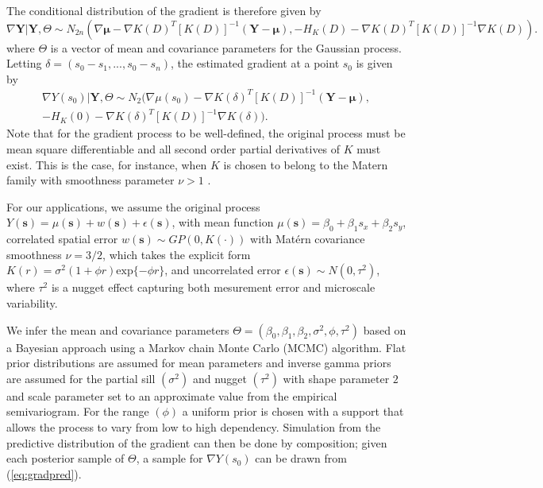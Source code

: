 \documentclass[12pt]{article}
\begin{document}
The conditional distribution of the gradient is therefore given by
\[
\nabla \textbf{Y} | \textbf{Y},\Theta \sim
N_{2n} \left(
\nabla \boldsymbol{\mu} - \nabla K(D)^T [K(D)]^{-1} (\textbf{Y} - \boldsymbol{\mu}), -H_K(D) - \nabla K(D)^T [K(D)]^{-1} \nabla K(D) \right).
\]
where $\Theta$ is a vector of mean and covariance parameters for the Gaussian process. Letting $\delta = (s_0-s_1,...,s_0-s_n)$, the estimated gradient at a point $s_0$ is given by
\begin{equation}
\begin{split}
\nabla Y(s_0) | \textbf{Y},\Theta \sim
N_2 \big(
\nabla \mu(s_0) - \nabla K(\delta)^T [K(D)]^{-1} (\textbf{Y} - \boldsymbol{\mu}), \\
-H_K(0) - \nabla K(\delta)^T [K(D)]^{-1} \nabla K(\delta) \big).
\label{eq:gradpred}
\end{split}
\end{equation}
Note that for the gradient process to be well-defined, the original process must be mean square differentiable and all second order partial derivatives of $K$ must exist. This is the case, for instance, when $K$ is chosen to belong to the Matern family with smoothness parameter $\nu > 1$ \citep{stein1999interpolation}.

For our applications, we assume the original process $Y(\bm s) = \mu(\bm s) + w(\bm s) + \epsilon(\bm s)$, with mean function  $\mu(\bm s) = \beta_0 + \beta_1 s_x + \beta_2 s_y$, correlated spatial error $w(\bm s) \sim GP(0, K(\cdot))$ with Mat\'ern covariance smoothness $\nu = 3/2$, which takes the explicit form $K(r)=\sigma^2 (1+\phi r) \text{exp}\{-\phi r\}$, and uncorrelated error $\epsilon(\bm s) \sim N(0,\tau^2)$, where $\tau^2$ is a nugget effect capturing both mesurement error and microscale variability.

We infer the mean and covariance parameters $\Theta = ( \beta_0, \beta_1, \beta_2, \sigma^2, \phi, \tau^2 )$ based on a Bayesian approach using a Markov chain Monte Carlo (MCMC) algorithm. Flat prior distributions are assumed for mean parameters and inverse gamma priors are assumed for the partial sill $(\sigma^2)$ and nugget $(\tau^2)$ with shape parameter $2$ and scale parameter set to an approximate value from the empirical semivariogram. For the range $(\phi)$ a uniform prior is chosen with a support that allows the process to vary from low to high dependency. Simulation from the predictive distribution of the gradient can then be done by composition; given each posterior sample of $\Theta$, a sample for $\nabla Y(s_0)$ can be drawn from (\ref{eq:gradpred}).
\end{document}

